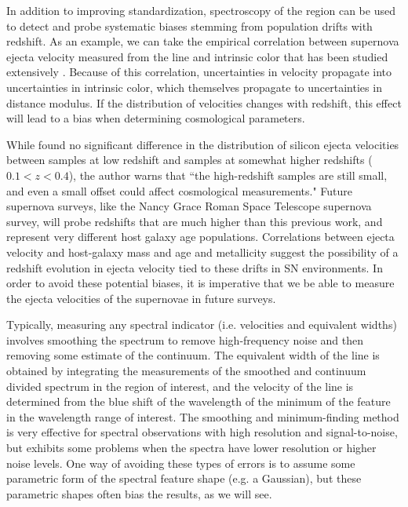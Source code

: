 In addition to improving standardization, spectroscopy of the \siliconii{} region can be used to detect and probe systematic biases stemming from population drifts with redshift. As an example, we can take the empirical correlation between supernova ejecta velocity measured from the \siliconii{} line and intrinsic color that has been studied extensively \citep{wang_improved_2009, foley_measuring_2011, foley_velocity_2011,foley_relation_2012,mandel_type_2014}. Because of this correlation, uncertainties in velocity propagate into uncertainties in intrinsic color, which themselves propagate to uncertainties in distance modulus. If the distribution of velocities changes with redshift, this effect will lead to a bias when determining cosmological parameters.

While \citet{foley_relation_2012} found no significant difference in the distribution of silicon ejecta velocities between samples at low redshift and samples at somewhat higher redshifts ($ 0.1 <  z  < 0.4$), the author warns that ``the high-redshift samples are still small, and even a small offset could affect cosmological measurements."  Future supernova surveys, like the Nancy Grace Roman Space Telescope supernova survey, will probe redshifts that are much higher than this previous work, and represent very different host galaxy age populations. Correlations between ejecta velocity and host-galaxy mass \citep{foley_relation_2012} and age and metallicity \citep{wang_evidence_2013} suggest the possibility of a redshift evolution in ejecta velocity tied to these drifts in SN environments. In order to avoid these potential biases, it is imperative that we be able to measure the ejecta velocities of the supernovae in future surveys.

Typically, measuring any spectral indicator (i.e. velocities and equivalent widths) involves smoothing the spectrum to remove high-frequency noise and then removing some estimate of the continuum. The equivalent width of the line is obtained by integrating the measurements of the smoothed and continuum divided spectrum in the region of interest, and the velocity of the line is determined from the blue shift of the wavelength of the minimum of the feature in the wavelength range of interest. The smoothing and minimum-finding method is very effective for spectral observations with high resolution and signal-to-noise, but exhibits some problems when the spectra have lower resolution or higher noise levels. One way of avoiding these types of errors is to assume some parametric form of the spectral feature shape (e.g. a Gaussian), but these parametric shapes often bias the results, as we will see.


